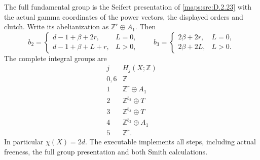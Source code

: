 \begin{theorem}
The full fundamental group is the Seifert presentation
of \ref{maps:src:D.2.23} with the actual gamma coordinates of the
power vectors, the displayed orders and clutch.
Write its abelianization as $\mathbb Z^r\oplus A_1$.
Then
\[
 b_2=
 \begin{cases}
 d-1+\beta+2r,&L=0,\\
 d-1+\beta+L+r,&L>0,
 \end{cases}
 \qquad
 b_3=
 \begin{cases}
 2\beta+2r,&L=0,\\
 2\beta+2L,&L>0.
 \end{cases}                                               \tag{D.WP8}\label{maps:eq:D.WP8}
\]
The complete integral groups are
\[
\begin{array}{c|c}
j&H_j(X;\mathbb Z)\\\hline
0,6&\mathbb Z\\
1&\mathbb Z^r\oplus A_1\\
2&\mathbb Z^{b_2}\oplus T\\
3&\mathbb Z^{b_3}\oplus T\\
4&\mathbb Z^{b_2}\oplus A_1\\
5&\mathbb Z^r .
\end{array}                                                \tag{D.WP9}\label{maps:eq:D.WP9}
\]
In particular $\chi(X)=2d$. The executable
 implements
all steps, including actual freeness, the full group
presentation and both Smith calculations.

\end{theorem}



